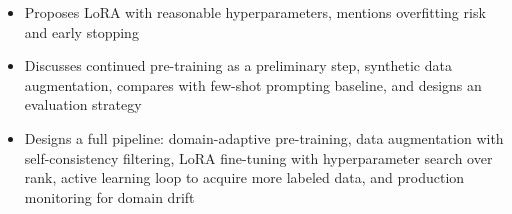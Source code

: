 \begin{interviewq}
\goodgreat
\begin{itemize}
    \item {} Proposes LoRA with reasonable hyperparameters, mentions
          overfitting risk and early stopping
    \item {} Discusses continued pre-training as a preliminary step,
          synthetic data augmentation, compares with few-shot prompting baseline,
          and designs an evaluation strategy
    \item {} Designs a full pipeline: domain-adaptive pre-training,
          data augmentation with self-consistency filtering, LoRA fine-tuning with
          hyperparameter search over rank, active learning loop to acquire more
          labeled data, and production monitoring for domain drift
\end{itemize}

\end{interviewq}

\bigskip

